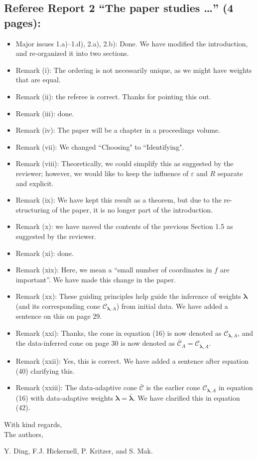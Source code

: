 \documentclass[11pt]{article}
\newcommand{\calC}{\mathcal{C}}
\begin{document}
\subsection*{Referee Report 2 ``The paper studies \ldots'' (4 pages):}

\begin{itemize}
\item Major issues 1.a)--1.d), 2.a), 2.b): Done. We have modified the introduction, and re-organized it into two sections. 
\item Remark (i): The ordering is not necessarily unique, as we might have weights 
that are equal. 
\item Remark (ii): the referee is correct. Thanks for pointing this out. 
\item Remark (iii): done. 
\item Remark (iv): The paper will be a chapter in a proceedings volume.
\item Remark (vii): We changed ``Choosing" to ``Identifying".
\item Remark (viii): Theoretically, we could simplify this as suggested by the reviewer; however, we would like to keep the influence of $\varepsilon$ and $R$ separate and explicit. 
\item Remark (ix): We have kept this result as a theorem, but due to the re-structuring of the paper, it is no longer part of the introduction. 
\item Remark (x): we have moved the contents of the previous Section 1.5 as suggested by the reviewer. 
\item Remark (xi): done. 
\item Remark (xix): Here, we mean a ``small number of coordinates in $f$ are important''. We have made this change in the paper.
\item Remark (xx): These guiding principles help guide the inference of weights $\boldsymbol{\lambda}$ (and its corresponding cone $\calC_{\boldsymbol{\lambda},A}$) from initial data. We have added a sentence on this on page 29. 
\item Remark (xxi): Thanks, the cone in equation (16) is now denoted as $\calC_{\boldsymbol{\lambda},A}$, and the data-inferred cone on page 30 is now denoted as $\bar{\calC}_A = \calC_{\bar{\boldsymbol{\lambda}},A}$.
\item Remark (xxii): Yes, this is correct. We have added a sentence after equation (40) clarifying this.
\item Remark (xxiii): The data-adaptive cone $\bar{\calC}$ is the earlier cone $\calC_{\boldsymbol{\lambda},A}$ in equation (16) with data-adaptive weights $\boldsymbol{\lambda} = \bar{\boldsymbol{\lambda}}$. We have clarified this in equation (42).

\end{itemize}

\bigskip 

\bigskip

\noindent With kind regards,\\[0.25cm]
The authors, 

\noindent Y. Ding, F.J. Hickernell, P. Kritzer, and S. Mak.
\end{document}
